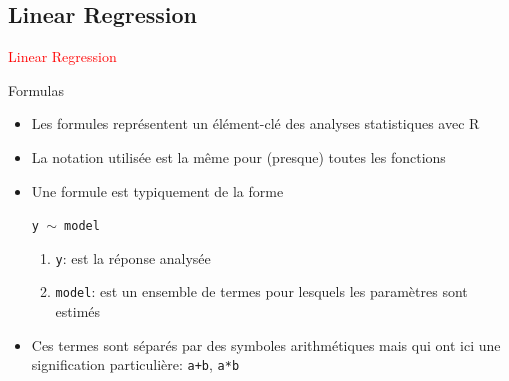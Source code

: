 \documentclass[11pt]{beamer}\usepackage[]{graphicx}\usepackage[]{color}
\makeatletter
\newcommand{\hlcom}[1]{\textcolor[rgb]{0.588,0.588,0.588}{#1}}%
\newcommand{\hlopt}[1]{\textcolor[rgb]{0.196,0.196,0.196}{#1}}%
\newcommand{\hlstd}[1]{\textcolor[rgb]{0.196,0.196,0.196}{#1}}%
\newcommand{\hlkwb}[1]{\textcolor[rgb]{0.627,0,0.314}{#1}}%
\newcommand{\hlkwc}[1]{\textcolor[rgb]{0,0.631,0.314}{#1}}%
\newcommand{\hlkwd}[1]{\textcolor[rgb]{0.78,0.227,0.412}{#1}}%
\newenvironment{kframe}{%
 \def\at@end@of@kframe{}%
 \ifinner\ifhmode%
  \def\at@end@of@kframe{\end{minipage}}%
  \begin{minipage}{\columnwidth}%
 \fi\fi%
 \def\FrameCommand##1{\hskip\@totalleftmargin \hskip-\fboxsep
 \colorbox{shadecolor}{##1}\hskip-\fboxsep
     \hskip-\linewidth \hskip-\@totalleftmargin \hskip\columnwidth}%
 \MakeFramed {\advance\hsize-\width
   \@totalleftmargin\z@ \linewidth\hsize
   \@setminipage}}%
 {\par\unskip\endMakeFramed%
 \at@end@of@kframe}
\newenvironment{knitrout}{}{} %
\newtheorem{rcode}{R code}[section]
\newcommand{\code}[1]{\texttt{#1}}
\makeatother
\begin{document}




\subsection{Linear Regression}

\begin{frame}
 \begin{center}
  \Huge{\textcolor{red}{Linear Regression}}
 \end{center}
\end{frame}


\begin{frame}[fragile]{Formulas}

\begin{itemize}
  \setlength\itemsep{1.5em}
  \item Les formules représentent un élément-clé des analyses statistiques avec R
  \pause \item La notation utilisée est la m\^{e}me pour (presque) toutes les fonctions
  \pause \item Une formule est typiquement de la forme 
  \begin{center}
  \code{y $\sim$ model}
  \end{center} 
  \pause \begin{enumerate}
  \item \code{y}: est la réponse analysée 
  \item \code{model}: est un ensemble de termes pour lesquels les paramètres sont estimés
  \end{enumerate}
  \pause \item Ces termes sont séparés par des symboles arithmétiques mais qui ont ici une signification
  particulière: \code{a+b}, \code{a*b}
 \end{itemize}
\end{frame}
\end{document}
